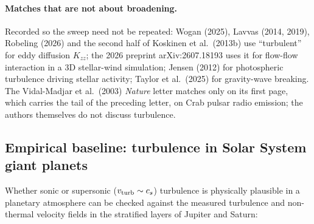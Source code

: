 \documentclass[english,a4paper]{my_memo}
\begin{document}
\paragraph{Matches that are not about broadening.}
Recorded so the sweep need not be repeated: Wogan (2025), Lavvas (2014,
2019), Robeling (2026) and the second half of Koskinen et al.\ (2013b) use
``turbulent'' for eddy diffusion $K_{zz}$; the 2026 preprint
arXiv:2607.18193 uses it for flow-flow interaction in a 3D stellar-wind
simulation; Jensen (2012) for
photospheric turbulence driving stellar activity; Taylor et al.\ (2025) for
gravity-wave breaking. The Vidal-Madjar et al.\ (2003) \textit{Nature} letter
matches only on its first page, which carries the tail of the preceding
letter, on Crab pulsar radio emission; the authors themselves do not discuss
turbulence.

\subsection{Empirical baseline: turbulence in Solar System giant planets}
\label{sec:solarsys_turb}

Whether sonic or supersonic ($v_{\rm turb} \sim c_s$) turbulence is
physically plausible in a planetary atmosphere can be checked against the
measured turbulence and non-thermal velocity fields in the stratified layers
of Jupiter and Saturn:
\end{document}
